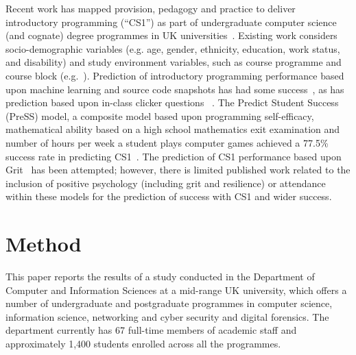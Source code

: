 \documentclass[sigconf]{acmart}
\begin{document}
Recent work has mapped provision, pedagogy and practice to deliver introductory programming (``CS1'') as part of undergraduate computer science (and cognate) degree programmes in UK universities~\cite{davenport-et-al:latice2016,murphy-et-al:programming2017,simon-et-al:sigcse2018}. Existing work considers socio-demographic variables (e.g. age, gender, ethnicity, education, work status, and disability) and study environment variables, such as course programme and course block (e.g.~\cite{Liao:2019:RML:3308443.3277569}). Prediction of introductory programming performance based upon machine learning and source code snapshots has had some success~\cite{Ahadi:2015:EML:2787622.2787717,Castro-Wunsch:2017:ENN:3017680.3017792}, as has prediction based upon in-class clicker questions ~\cite{Liao:2019:RML:3308443.3277569}. The Predict Student Success (PreSS) model, a composite model based upon programming self-efficacy, mathematical ability based on a high school mathematics exit examination and number of hours per week a student plays computer games achieved a 77.5\% success rate in predicting CS1~\cite{Quille:2018:PPS:3197091.3197101}. The prediction of CS1 performance based upon Grit~\cite{Sigurdson:2018:EGC:3279720.3279743} has been attempted; however, there is limited published work related to the inclusion of positive psychology (including grit and resilience) or attendance within these models for the prediction of success with CS1 and wider success.

\section{Method}
This paper reports the results of a study conducted in the Department of Computer and Information Sciences at a mid-range UK university, which offers a number of undergraduate and postgraduate programmes in computer science, information science, networking and cyber security and digital forensics. The department currently has 67 full-time members of academic staff and approximately 1,400 students enrolled across all the programmes.
\end{document}

